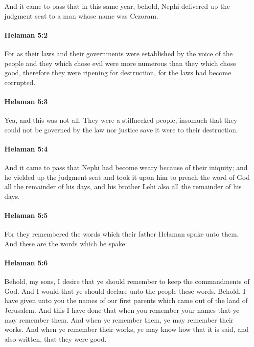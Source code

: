 			And it came to pass that in this same year,
			behold, Nephi delivered up the judgment seat to a man whose name was Cezoram.

		\paragraph{Helaman 5:2} %
			\label{HELAMAN-5-2}

			For as their laws and their governments were established by the voice of the people
			and they which chose evil were more numerous than they which chose good,
			therefore they were ripening for destruction,
			for the laws had become corrupted.

		\paragraph{Helaman 5:3} %
			\label{HELAMAN-5-3}

			Yea, and this was not all.
			They were a stiffnecked people,
			insomuch that they could not be governed by the law nor justice
			save it were to their destruction.

		\paragraph{Helaman 5:4} %
			\label{HELAMAN-5-4}

			And it came to pass that Nephi had become weary because of their iniquity;
			and he yielded up the judgment seat and took it upon him
			to preach the word of God all the remainder of his days,
			and his brother Lehi also all the remainder of his days.

		\paragraph{Helaman 5:5} %
			\label{HELAMAN-5-5}

			For they remembered the words which their father Helaman spake unto them.
			And these are the words which he spake:

		\paragraph{Helaman 5:6} %
			\label{HELAMAN-5-6}

			Behold, my sons, I desire
			that ye should remember to keep the commandments of God.
			And I would that ye should declare unto the people these words.
			Behold, I have given unto you the names of our first parents
			which came out of the land of Jerusalem.
			And this I have done
			that when you remember your names
			that ye may remember them.
			And when ye remember them,
			ye may remember their works.
			And when ye remember their works,
			ye may know how that it is said, and also written, that they were good.


